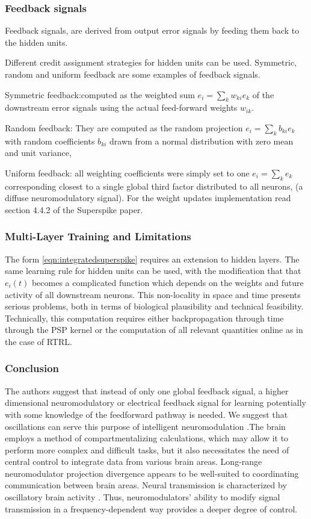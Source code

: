 \documentclass[12pt]{report}
\begin{document}
\subsubsection{Feedback signals}
Feedback signals, are derived from output error signals by feeding them back to the hidden units.

Different credit assignment strategies for hidden units can be used. Symmetric, random and uniform feedback are some examples of feedback signals. 

Symmetric feedback:computed as the weighted sum $e_{i}=\sum_{k} w_{k i} e_{k}$ of the downstream error signals using the actual feed-forward weights $w_{i k} .$  

Random feedback: They are computed as the random projection $e_{i}=\sum_{k} b_{k i} e_{k}$ with random coefficients $b_{k i}$ drawn from a normal distribution with zero mean and unit variance,

Uniform feedback: all weighting coefficients were simply set to one $e_{i}=\sum_{k} e_{k}$ corresponding closest to a single global third factor distributed to all neurons, (a diffuse neuromodulatory signal). For the weight updates implementation read section 4.4.2 of the Superspike paper.
\subsubsection{Multi-Layer Training and Limitations}
The form \ref{eqn:integratedsuperspike} requires an extension to hidden layers. The same learning rule for hidden units can be used, with the modification that that $e_{i}(t)$ becomes a complicated function which depends on the weights and future activity of all downstream neurons. This non-locality in space and time presents serious problems, both in terms of biological plausibility and technical feasibility. Technically, this computation requires either backpropagation through time through the PSP kernel or the computation of all relevant quantities online as in the case of RTRL.
\subsubsection{Conclusion}
The authors suggest that instead of only one global feedback signal, a higher dimensional neuromodulatory or electrical feedback signal for learning potentially with some knowledge of the feedforward pathway is needed. We suggest that oscillations can serve this purpose of intelligent neuromodulation .The brain employs a method of compartmentalizing calculations, which may allow it to perform more complex and difficult tasks, but it also necessitates the need of central control to integrate data from various brain areas. Long-range neuromodulator projection divergence appears to be well-suited to coordinating communication between brain areas. Neural transmission is characterized by oscillatory brain activity \cite{ito2008}. Thus, neuromodulators' ability to modify signal transmission in a frequency-dependent way provides a deeper degree of control.
\end{document}
